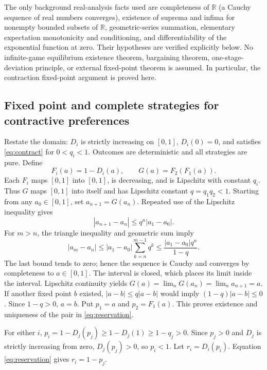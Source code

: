 \documentclass[11pt]{article}
\newcommand{\R}{\mathbb R}
\begin{document}
The only background real-analysis facts used are completeness of $\R$ (a Cauchy sequence of real numbers converges), existence of suprema and infima for nonempty bounded subsets of $\R$, geometric-series summation, elementary expectation monotonicity and conditioning, and differentiability of the exponential function at zero. Their hypotheses are verified explicitly below. No infinite-game equilibrium existence theorem, bargaining theorem, one-stage-deviation principle, or external fixed-point theorem is assumed. In particular, the contraction fixed-point argument is proved here.

\subsection{Fixed point and complete strategies for contractive preferences}\label{app:general}
Restate the domain: $D_i$ is strictly increasing on $[0,1]$, $D_i(0)=0$, and satisfies \eqref{eq:contract} for $0<q_i<1$. Outcomes are deterministic and all strategies are pure. Define
\begin{equation}\label{eq:fg}
 F_i(a)=1-D_i(a),\qquad G(a)=F_2(F_1(a)).
\end{equation}
Each $F_i$ maps $[0,1]$ into $[0,1]$, is decreasing, and is Lipschitz with constant $q_i$. Thus $G$ maps $[0,1]$ into itself and has Lipschitz constant $q=q_1q_2<1$. Starting from any $a_0\in[0,1]$, set $a_{n+1}=G(a_n)$. Repeated use of the Lipschitz inequality gives
\begin{equation}
 |a_{n+1}-a_n|\le q^n|a_1-a_0|.
\end{equation}
For $m>n$, the triangle inequality and geometric sum imply
\begin{equation}
 |a_m-a_n|\le |a_1-a_0|\sum_{k=n}^{m-1}q^k
 \le \frac{|a_1-a_0|q^n}{1-q}.
\end{equation}
The last bound tends to zero; hence the sequence is Cauchy and converges by completeness to $a\in[0,1]$. The interval is closed, which places its limit inside the interval. Lipschitz continuity yields $G(a)=\lim_nG(a_n)=\lim_na_{n+1}=a$. If another fixed point $b$ existed, $|a-b|\le q|a-b|$ would imply $(1-q)|a-b|\le0$. Since $1-q>0$, $a=b$. Put $p_1=a$ and $p_2=F_1(a)$. This proves existence and uniqueness of the pair in \eqref{eq:reservation}.

For either $i$, $p_i=1-D_j(p_j)\ge1-D_j(1)\ge1-q_j>0$. Since $p_j>0$ and $D_j$ is strictly increasing from zero, $D_j(p_j)>0$, so $p_i<1$. Let $r_i=D_i(p_i)$. Equation \eqref{eq:reservation} gives $r_i=1-p_j$.
\end{document}
